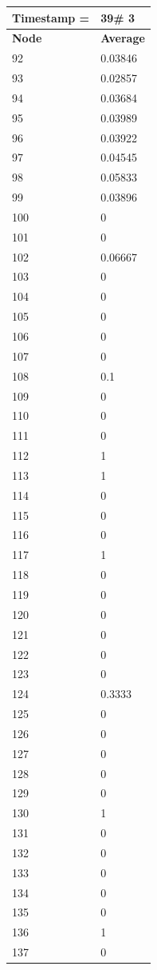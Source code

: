 \begin{tabular}{|l||l|}
\hline
\textbf{Timestamp =} & \textbf{39}\# 3\\\hline
	\textbf{Node} & \textbf{Average} \\ \hline
\hline
	92 & 0.03846 \\ \hline
	93 & 0.02857 \\ \hline
	94 & 0.03684 \\ \hline
	95 & 0.03989 \\ \hline
	96 & 0.03922 \\ \hline
	97 & 0.04545 \\ \hline
	98 & 0.05833 \\ \hline
	99 & 0.03896 \\ \hline
	100 & 0 \\ \hline
	101 & 0 \\ \hline
	102 & 0.06667 \\ \hline
	103 & 0 \\ \hline
	104 & 0 \\ \hline
	105 & 0 \\ \hline
	106 & 0 \\ \hline
	107 & 0 \\ \hline
	108 & 0.1 \\ \hline
	109 & 0 \\ \hline
	110 & 0 \\ \hline
	111 & 0 \\ \hline
	112 & 1 \\ \hline
	113 & 1 \\ \hline
	114 & 0 \\ \hline
	115 & 0 \\ \hline
	116 & 0 \\ \hline
	117 & 1 \\ \hline
	118 & 0 \\ \hline
	119 & 0 \\ \hline
	120 & 0 \\ \hline
	121 & 0 \\ \hline
	122 & 0 \\ \hline
	123 & 0 \\ \hline
	124 & 0.3333 \\ \hline
	125 & 0 \\ \hline
	126 & 0 \\ \hline
	127 & 0 \\ \hline
	128 & 0 \\ \hline
	129 & 0 \\ \hline
	130 & 1 \\ \hline
	131 & 0 \\ \hline
	132 & 0 \\ \hline
	133 & 0 \\ \hline
	134 & 0 \\ \hline
	135 & 0 \\ \hline
	136 & 1 \\ \hline
	137 & 0 \\ \hline
\end{tabular}

